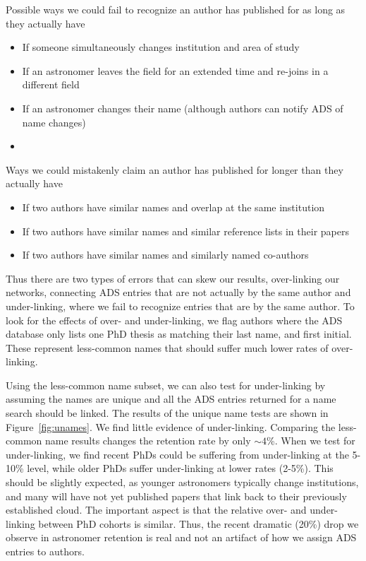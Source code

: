 \documentclass{emulateapj}
\begin{document}


Possible ways we could fail to recognize an author has published for as long as they actually have
\begin{itemize}
\item{If someone simultaneously changes institution and area of study}
  \item{If an astronomer leaves the field for an extended time and re-joins in a different field}
\item{If an astronomer changes their name (although authors can notify ADS of name changes)}
  \item{}
\end{itemize}

Ways we could mistakenly claim an author has published for longer than they actually have
\begin{itemize}
\item{If two authors have similar names and overlap at the same institution}
\item{If two authors have similar names and similar reference lists in their papers}
  \item{If two authors have similar names and similarly named co-authors}
\end{itemize}

Thus there are two types of errors that can skew our results, over-linking our networks, connecting ADS entries that are not actually by the same author and under-linking, where we fail to recognize entries that are by the same author.  To look for the effects of over- and under-linking, we flag authors where the ADS database only lists one PhD thesis as matching their last name, and first initial. These represent less-common names that should suffer much lower rates of over-linking.

Using the less-common name subset, we can also test for under-linking by assuming the names are unique and all the ADS entries returned for a name search should be linked.  The results of the unique name tests are shown in Figure~\ref{fig:unames}. We find little evidence of under-linking. Comparing the less-common name results changes the retention rate by only $\sim4$\%. When we test for under-linking, we find recent PhDs could be suffering from under-linking at the 5-10\% level, while older PhDs suffer under-linking at lower rates (2-5\%).  This should be slightly expected, as younger astronomers typically change institutions, and many will have not yet published papers that link back to their previously established cloud.  The important aspect is that the relative over- and under-linking between PhD cohorts is similar.  Thus, the recent dramatic (20\%) drop we observe in astronomer retention is real and not an artifact of how we assign ADS entries to authors.
\end{document}
